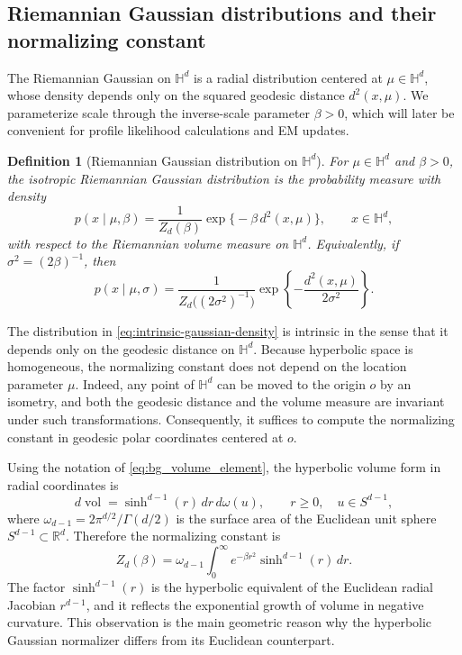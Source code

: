 \documentclass[11pt]{article}
\newtheorem{definition}{Definition}
\begin{document}
\subsection{Riemannian Gaussian distributions and their normalizing constant}\label{subsec:model-definition}

The Riemannian Gaussian on \(\mathbb{H}^d\) is a radial distribution centered at \(\mu\in\mathbb{H}^d\), whose density depends only on the squared geodesic distance \(d^2(x,\mu)\). We parameterize scale through the inverse-scale parameter \(\beta>0\), which will later be convenient for profile likelihood calculations and EM updates.

\begin{definition}[Riemannian Gaussian distribution on \(\mathbb{H}^d\)]\label{def:intrinsic-gaussian}
For \(\mu\in\mathbb{H}^d\) and \(\beta>0\), the isotropic Riemannian Gaussian distribution is the probability measure with density
\begin{equation}\label{eq:intrinsic-gaussian-density}
p(x\mid \mu,\beta)
=
\frac{1}{Z_d(\beta)}
\exp\bigl\{-\beta\, d^2(x,\mu)\bigr\},
\qquad x\in\mathbb{H}^d,
\end{equation}
with respect to the Riemannian volume measure on \(\mathbb{H}^d\). Equivalently, if \(\sigma^2=(2\beta)^{-1}\), then
\begin{equation}\label{eq:intrinsic-gaussian-sigma}
p(x\mid \mu,\sigma)
=
\frac{1}{Z_d\bigl((2\sigma^2)^{-1}\bigr)}
\exp\!\left\{-\frac{d^2(x,\mu)}{2\sigma^2}\right\}.
\end{equation}
\end{definition}




The distribution in \eqref{eq:intrinsic-gaussian-density} is intrinsic in the sense that it depends only on the geodesic distance on \(\mathbb{H}^d\). Because hyperbolic space is homogeneous, the normalizing constant does not depend on the location parameter \(\mu\). Indeed, any point of \(\mathbb{H}^d\) can be moved to the origin \(o\) by an isometry, and both the geodesic distance and the volume measure are invariant under such transformations. Consequently, it suffices to compute the normalizing constant in geodesic polar coordinates centered at \(o\).

Using the notation of \eqref{eq:bg_volume_element}, the hyperbolic volume form in radial coordinates is
\[
d\operatorname{vol}
=
\sinh^{d-1}(r)\,dr\,d\omega(u),
\qquad r\ge 0,\quad u\in S^{d-1},
\]
where \(\omega_{d-1}=2\pi^{d/2}/\Gamma(d/2)\) is the surface area of the Euclidean unit sphere \(S^{d-1}\subset\mathbb{R}^d\). Therefore the normalizing constant is
\begin{equation}\label{eq:normalizer-polar}
Z_d(\beta)
=
\omega_{d-1}\int_0^\infty e^{-\beta r^2}\sinh^{d-1}(r)\,dr.
\end{equation}
The factor \(\sinh^{d-1}(r)\) is the hyperbolic equivalent of the Euclidean radial Jacobian \(r^{d-1}\), and it reflects the exponential growth of volume in negative curvature. This observation is the main geometric reason why the hyperbolic Gaussian normalizer differs from its Euclidean counterpart.
\end{document}
